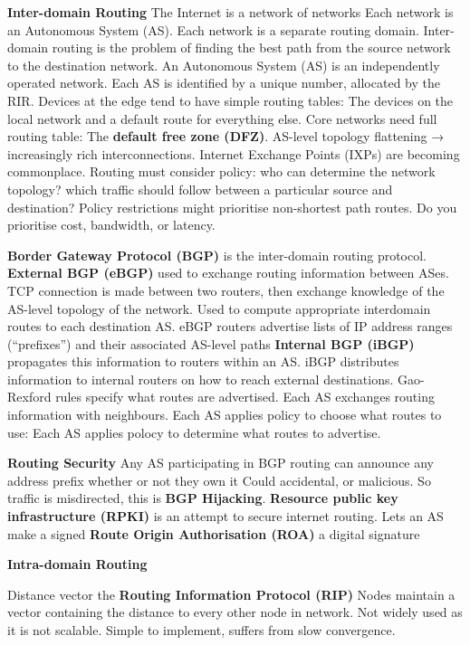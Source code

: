 \documentclass{article}
\begin{document}
\textbf{Inter-domain Routing}
The Internet is a network of networks
Each network is an Autonomous System (AS).
Each network is a separate routing domain.
Inter-domain routing is the problem of finding the best path from the source network to the destination network.
An Autonomous System (AS) is an independently operated network.
Each AS is identified by a unique number, allocated by the RIR\@.
Devices at the edge tend to have simple routing tables: The devices on the local network and a default route for everything else.
Core networks need full routing table: The \textbf{default free zone (DFZ)}.
AS-level topology flattening → increasingly rich interconnections.
Internet Exchange Points (IXPs) are becoming commonplace.
Routing must consider policy: who can determine the network topology? which traffic should follow between a particular source and destination?
Policy restrictions might prioritise non-shortest path routes. Do you prioritise cost, bandwidth, or latency.

\textbf{Border Gateway Protocol (BGP)} is the inter-domain routing protocol.
\textbf{External BGP (eBGP)} used to exchange routing information between ASes.
TCP connection is made between two routers, then exchange knowledge of the AS-level topology of the network.
Used to compute appropriate interdomain routes to each destination AS\@.
eBGP routers advertise lists of IP address ranges (“prefixes”) and their associated AS-level paths
\textbf{Internal BGP (iBGP)} propagates this information to routers within an AS\@.
iBGP distributes information to internal routers on how to reach external destinations.
Gao-Rexford rules specify what routes are advertised.
Each AS exchanges routing information with neighbours.
Each AS applies policy to choose what routes to use:
Each AS applies polocy to determine what routes to advertise.

\textbf{Routing Security}
Any AS participating in BGP routing can announce any address prefix \- whether or not they own it
Could accidental, or malicious.
So traffic is misdirected, this is \textbf{BGP Hijacking}.
\textbf{Resource public key infrastructure (RPKI)} is an attempt to secure internet routing.
Lets an AS make a signed \textbf{Route Origin Authorisation (ROA)} \- a digital signature

\textbf{Intra-domain Routing}

Distance vector \- the \textbf{Routing Information Protocol (RIP)}
Nodes maintain a vector containing the distance to every other node in network.
Not widely used as it is not scalable. Simple to implement, suffers from slow convergence.
\end{document}
